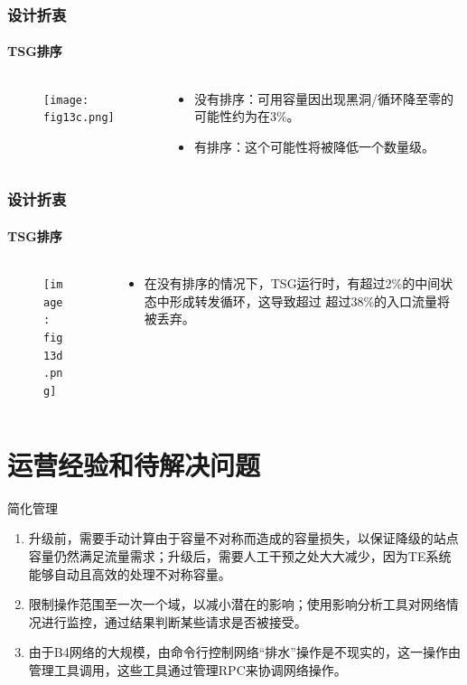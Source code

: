 \begin{frame}
    \frametitle{设计折衷}
    \framesubtitle{TSG排序}
    \begin{columns}
        \begin{column}{0.4\textwidth}
            \begin{figure}
                \texttt{[image: fig13c.png]}
            \end{figure}
        \end{column}
        \begin{column}{0.6\textwidth}
            \begin{itemize}
                \item 没有排序：可用容量因出现黑洞/循环降至零的可能性约为在3\%。
                \item 有排序：这个可能性将被降低一个数量级。
            \end{itemize}
        \end{column}
    \end{columns}
\end{frame}

\begin{frame}
    \frametitle{设计折衷}
    \framesubtitle{TSG排序}
    \begin{columns}
        \begin{column}{0.4\textwidth}
            \begin{figure}
                \texttt{[image: fig13d.png]}
            \end{figure}
        \end{column}
        \begin{column}{0.6\textwidth}
            \begin{itemize}
                \item 在没有排序的情况下，TSG运行时，有超过2\%的中间状态中形成转发循环，这导致超过 超过38\%的入口流量将被丢弃。
            \end{itemize}
        \end{column}
    \end{columns}
\end{frame}

\section{运营经验和待解决问题}
\begin{frame}{简化管理}
\begin{enumerate}
    \item 升级前，需要手动计算由于容量不对称而造成的容量损失，以保证降级的站点容量仍然满足流量需求；升级后，需要人工干预之处大大减少，因为TE系统能够自动且高效的处理不对称容量。
    \item 限制操作范围至一次一个域，以减小潜在的影响；使用影响分析工具对网络情况进行监控，通过结果判断某些请求是否被接受。
    \item 由于B4网络的大规模，由命令行控制网络“排水”操作是不现实的，这一操作由管理工具调用，这些工具通过管理RPC来协调网络操作。
\end{enumerate}

\end{frame}

